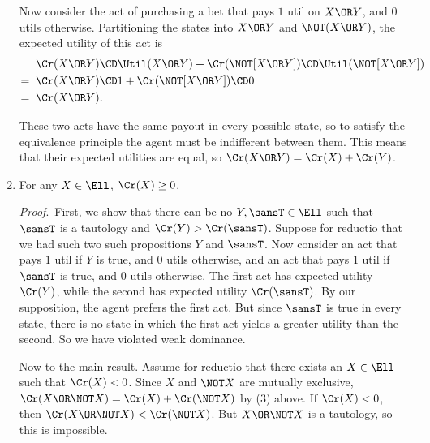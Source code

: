\begin{enumerate}
Now consider the act of purchasing a bet that pays $1$ util on $X \OR Y$, and $0$ utils otherwise. Partitioning the states into $X \OR Y$ and $\NOT (X \OR Y)$, the expected utility of this act is
\begin{equation}
\begin{aligned}
	  &\;\; \Cr(X \OR Y) \CD \Util(X \OR Y) + \Cr(\NOT [X \OR Y]) \CD \Util(\NOT [X \OR Y])\\
	= &\;\; \Cr(X \OR Y) \CD 1 + \Cr(\NOT [X \OR Y]) \CD 0\\
    = &\;\; \Cr(X \OR Y).
\end{aligned}
\end{equation}

These two acts have the same payout in every possible state, so to satisfy the equivalence principle the agent must be indifferent between them. This means that their expected utilities are equal, so $\Cr(X \OR Y)=\Cr(X) + \Cr(Y)$.


\item For any $X \in \Ell$, $\Cr(X) \ge 0$.

\emph{Proof}.\, First, we show that there can be no $Y, \sansT \in \Ell$ such that $\sansT$ is a tautology and $\Cr(Y)>\Cr(\sansT)$. Suppose for reductio that we had such two such propositions $Y$ and $\sansT$. Now consider an act that pays $1$ util if $Y$ is true, and $0$ utils otherwise, and an act that pays $1$ util if $\sansT$ is true, and $0$ utils otherwise. The first act has expected utility $\Cr(Y)$, while the second has expected utility $\Cr(\sansT)$. By our supposition, the agent prefers the first act. But since $\sansT$ is true in every state, there is no state in which the first act yields a greater utility than the second. So we have violated weak dominance.

Now to the main result. Assume for reductio that there exists an $X \in \Ell$ such that $\Cr(X)<0$. Since $X$ and $\NOT X$ are mutually exclusive, $\Cr(X \OR \NOT X)=\Cr(X)+\Cr(\NOT X)$ by (3) above. If $\Cr(X)<0$, then $\Cr(X \OR \NOT X)<\Cr(\NOT X)$. But $X \OR \NOT X$ is a tautology, so this is impossible.

\end{enumerate}
